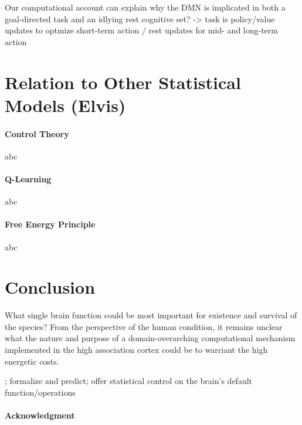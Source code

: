 \documentclass{article} %
\begin{document}
Our computational account can explain why the DMN is implicated in both a goal-directed task and an idlying rest cognitive set? -> task is policy/value updates to optmize short-term action / rest updates for mid- and long-term action


\section{Relation to Other Statistical Models (Elvis)}
\paragraph{Control Theory}
abc

\paragraph{Q-Learning}
abc

\paragraph{Free Energy Principle}
abc



\section{Conclusion}
What single brain function could be most important for existence and survival of the species?
From the perspective of the human condition, it remains unclear what the nature and purpose of a domain-overarching computational mechanism implemented in the high association cortex could be to warriant the high energetic costs.

; formalize and predict; offer statistical control on the brain's default function/operations




\paragraph{Acknowledgment}

\small


\end{document}
